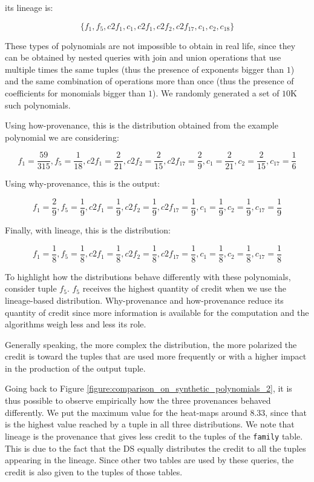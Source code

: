 its lineage is: 

{\footnotesize
\[
\{f_1, f_5, c2f_1, c_1, c2f_1, c2f_2, c2f_{17}, c_1, c_2, c_{18} \}
\]
 }
 
These types of polynomials are not impossible to obtain in real life, since they can be obtained by nested queries with join and union operations that use multiple times the same tuples (thus the presence of exponents bigger than $1$) and the same combination of operations more than once (thus the presence of coefficients for monomials bigger than $1$). 
We randomly generated a set of $10$K such polynomials. 

Using how-provenance, this is the distribution obtained from the example polynomial we are considering:

{\footnotesize
\[
f_1 = \frac{59}{315}, f_5 = \frac{1}{18}, c2f_1 = \frac{2}{21}, c2f_2 = \frac{2}{15}, 
c2f_{17}=\frac{2}{9} , c_1 = \frac{2}{21}, c_2 = \frac{2}{15}, c_{17} = \frac{1}{6} 
\]
}

Using why-provenance, this is the output:

{\footnotesize
\[
f_1 = \frac{2}{9}, f_5 = \frac{1}{9}, c2f_1 = \frac{1}{9}, c2f_2 = \frac{1}{9}, 
c2f_{17}=\frac{1}{9} , c_1 = \frac{1}{9}, c_2 = \frac{1}{9}, c_{17} = \frac{1}{9} 
\]
}


Finally, with lineage, this is the distribution:

{\footnotesize
\[
f_1 = \frac{1}{8}, f_5 = \frac{1}{8}, c2f_1 = \frac{1}{8}, c2f_2 = \frac{1}{8}, 
c2f_{17}=\frac{1}{8} , c_1 = \frac{1}{8}, c_2 = \frac{1}{8}, c_{17} = \frac{1}{8} 
\]
}

To highlight how the distributions behave differently with these polynomials, consider tuple $f_5$.
$f_5$ receives the highest quantity of credit when we use the lineage-based distribution. Why-provenance and how-provenance reduce its quantity of credit since more information is available for the computation and the algorithms weigh less and less its role. 

Generally speaking, the more complex the distribution, the more polarized the credit is toward the tuples that are used more frequently or with a higher impact in the production of the output tuple. 

Going back to Figure \ref{figure:comparison_on_synthetic_polynomials_2}, it is thus possible to observe empirically how the three provenances behaved differently. We put the maximum value for the heat-maps around $8.33$, since that is the highest value reached by a tuple in all three distributions. 
We note that lineage is the provenance that gives less credit to the tuples of the \texttt{family} table. This is due to the fact that the DS equally distributes the credit to all the tuples appearing in the lineage. Since other two tables are used by these queries, the credit is also given to the tuples of those tables. 

